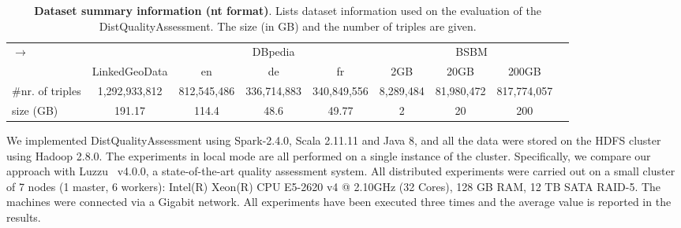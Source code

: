 \begin{table}
\centering
\begin{tabularx}{\textwidth}{Xcccccccc}	
\toprule
\multirow{2}{*}{$\longrightarrow$} & \multicolumn{1}{c}{} & \multicolumn{3}{c|}{DBpedia} & \multicolumn{4}{c}{BSBM} \\
\cline{3-9}  \rule{0pt}{10pt}
& LinkedGeoData & \scriptsize{en} & \scriptsize{de} & \scriptsize{fr}  & \scriptsize{2GB} &\scriptsize{20GB} &\scriptsize{200GB} &\\
\midrule
\scriptsize{\#nr. of triples}& \scriptsize{1,292,933,812} & \scriptsize{812,545,486} & \scriptsize{336,714,883} & \scriptsize{340,849,556} & \scriptsize{8,289,484} & \scriptsize{81,980,472} & \scriptsize{817,774,057} &  \\
\scriptsize{size (GB)} & \scriptsize{191.17} & \scriptsize{114.4} & \scriptsize{48.6} & \scriptsize{49.77} & \scriptsize{2} &\scriptsize{20} &\scriptsize{200} &\\
\bottomrule
\end{tabularx}
{\caption{\textbf{Dataset summary information (nt format)}.
Lists dataset information used on the evaluation of the DistQualityAssessment.
The size (in GB) and the number of triples are given.}
\label{tab:qa-dataset_info}}
\end{table}

We implemented DistQualityAssessment using Spark-2.4.0, Scala 2.11.11 and Java 8, and all the data were stored on the \gls{HDFS} cluster using Hadoop 2.8.0.
The experiments in local mode are all performed on a single instance of the cluster.
Specifically, we compare our approach with Luzzu~\cite{debattista2016luzzu} v4.0.0, a state-of-the-art quality assessment system.
All distributed experiments were carried out on a small cluster of 7 nodes (1 master, 6 workers): Intel(R) Xeon(R) CPU E5-2620 v4 @ 2.10GHz (32 Cores), 128 GB RAM, 12 TB SATA RAID-5.
The machines were connected via a Gigabit network.
All experiments have been executed three times and the average value is reported in the results.


